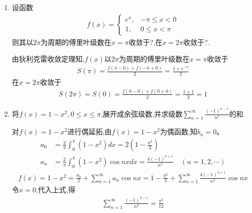 \documentclass[12pt, a4paper, oneside, UTF8]{ctexbook}
\begin{document}
\begin{enumerate}[label=\arabic*.,start=15]
    \item 设函数
    \begin{align*}
    f(x)=\begin{cases}
    e^x, & -\pi\leq x<0 \\
    1, & 0\leq x<\pi
    \end{cases}
    \end{align*}
    则其以$2\pi$为周期的傅里叶级数在$x=\pi$收敛于?,在$x=2\pi$收敛于?.
    \begin{solution}
    由狄利克雷收敛定理知,$f(x)$以$2\pi$为周期的傅里叶级数在$x=\pi$收敛于
    \begin{align*}
    S(\pi)=\frac{f(\pi-0)+f(-\pi+0)}{2}=\frac{1+e^{-\pi}}{2}
    \end{align*}
    在$x=2\pi$收敛于
    \begin{align*}
    S(2\pi)=S(0)=\frac{f(0-0)+f(0+0)}{2}=\frac{1+1}{2}=1
    \end{align*}
    \end{solution}
    
    \item 将$f(x)=1-x^2,0\leq x\leq\pi$,展开成余弦级数,并求级数$\displaystyle \sum_{n=1}^{\infty}\frac{(-1)^{n-1}}{n^2}$的和.
    
    \begin{solution}
    对$f(x)=1-x^2$进行偶延拓,由$f(x)=1-x^2$为偶函数,知$b_n=0$。
    \begin{align*}
    a_0&=\frac{2}{\pi}\int_0^\pi(1-x^2)dx=2\left(1-\frac{\pi^2}{3}\right) \\
    a_n&=\frac{2}{\pi}\int_0^\pi(1-x^2)\cos nx dx=\frac{4(-1)^{n+1}}{n^2} \quad (n=1,2,\cdots)
    \end{align*}
    \begin{align*}
    f(x)=1-x^2=\frac{a_0}{2}+\sum_{n=1}^{\infty}a_n\cos nx=1-\frac{\pi^2}{3}+\sum_{n=1}^{\infty}\frac{4(-1)^{n+1}}{n^2}\cos nx
    \end{align*}
    令$x=0$,代入上式,得
    \begin{align*}
    \sum_{n=1}^{\infty}\frac{(-1)^{n-1}}{n^2}=\frac{\pi^2}{12}
    \end{align*}
    \end{solution}
\end{enumerate}

\ifx\allfiles\undefined
\end{document}
